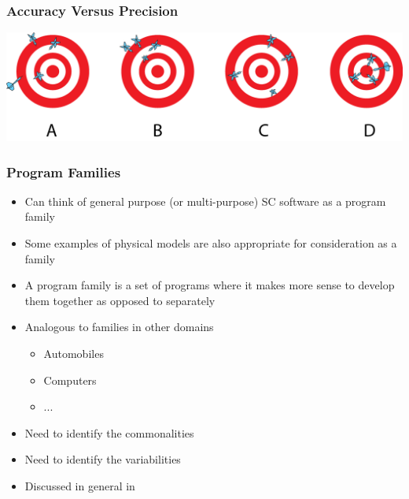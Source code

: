 \documentclass[t,12pt,numbers,fleqn]{beamer}
\begin{document}

\begin{frame}
\frametitle{Accuracy Versus Precision}

\begin{center}
 \includegraphics[width=1.0\textwidth]{../Figures/AccuracyPrecision_FromUniversityOfHawaiiAtManoa.png}
\end{center}


\end{frame}


\begin{frame}
\frametitle{Program Families}

\begin{itemize}

\item Can think of general purpose (or multi-purpose) SC software as a program
  family
\item Some examples of physical models are also appropriate for consideration as
  a family
\item A program family is a set of programs where it makes more sense to develop
  them together as opposed to separately
\item Analogous to families in other domains
\begin{itemize}
\item Automobiles
\item Computers
\item ...
\end{itemize}
\item Need to identify the commonalities
\item Need to identify the variabilities
\item Discussed in general in \cite{ClementsAndNorthrop2001,PohlEtAl2005}
\end{itemize}

\end{frame}
\end{document}
